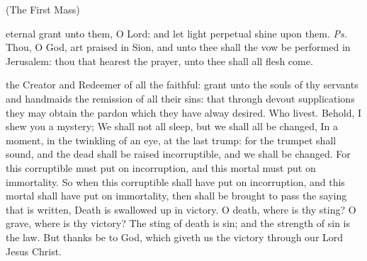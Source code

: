 \centerline{\small{(The First Mass)}}

\introit
{} eternal grant unto them, O Lord: and let light perpetual shine upon them. \textit{Ps.} Thou, O God, art praised in Sion, and unto thee shall the vow be performed in Jerusalem: thou that hearest the prayer, unto thee shall all flesh come.

\collect
{} the Creator and Redeemer of all the faithful: grant unto the souls of thy servants and handmaids the remission of all their sins: that through devout supplications they may obtain the pardon which they have alway desired. Who livest.
 Behold, I shew you a mystery; We shall not all sleep, but we shall all be changed, In a moment, in the twinkling of an eye, at the last trump: for the trumpet shall sound, and the dead shall be raised incorruptible, and we shall be changed. For this corruptible must put on incorruption, and this mortal must put on immortality. So when this corruptible shall have put on incorruption, and this mortal shall have put on immortality, then shall be brought to pass the saying that is written, Death is swallowed up in victory. O death, where is thy sting? O grave, where is thy victory? The sting of death is sin; and the strength of sin is the law. But thanks be to God, which giveth us the victory through our Lord Jesus Christ.



